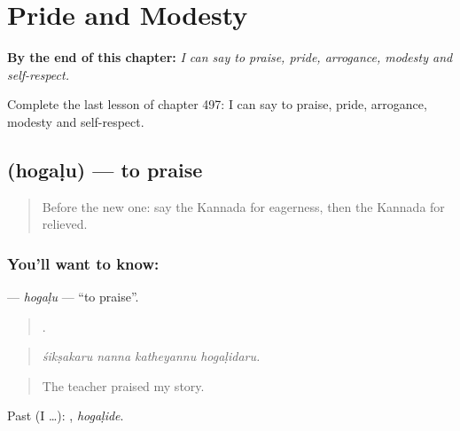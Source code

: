 
\chapter{Pride and Modesty}
\label{ch:ka-pride-and-modesty}

\begin{chapteropening}
\textbf{By the end of this chapter:} \emph{I can say to praise, pride, arrogance, modesty and self-respect.}

Complete the last lesson of chapter 497: I can say to praise, pride, arrogance, modesty and self-respect.
\end{chapteropening}

\section[\texorpdfstring{\kn{ಹೊಗಳು} (hogaḷu)}{ಹೊಗಳು (hogaḷu)}]{ (hogaḷu) — to praise}

\label{lesson:KA-C497-hogalu}



\begin{quote}
Before the new one: say the Kannada for eagerness, then the Kannada for relieved.
\end{quote}

\subsection*{You'll want to know: }
\textbf{} — \emph{hogaḷu} — \textquotedblleft{}to praise\textquotedblright{}.

\begin{quote}
   .
\end{quote}

\begin{quote}
\emph{śikṣakaru nanna katheyannu hogaḷidaru.}
\end{quote}

\begin{quote}
The teacher praised my story.
\end{quote}

Past (I …): , \emph{hogaḷide}.

